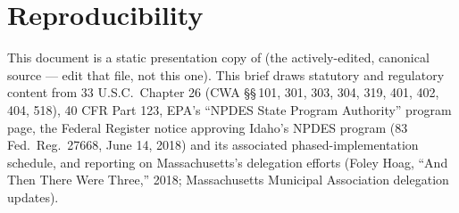 \documentclass[11pt]{article}
\begin{document}
\section*{Reproducibility}
This document is a static presentation copy of 
(the actively-edited, canonical source --- edit that file, not this one). This brief
draws statutory and regulatory content from 33 U.S.C.\ Chapter 26 (CWA \S\S\,101, 301,
303, 304, 319, 401, 402, 404, 518), 40 CFR Part 123, EPA's ``NPDES State Program
Authority'' program page, the Federal Register notice approving Idaho's NPDES program
(83 Fed.\ Reg.\ 27668, June 14, 2018) and its associated phased-implementation
schedule, and reporting on Massachusetts's delegation efforts (Foley Hoag, ``And Then
There Were Three,'' 2018; Massachusetts Municipal Association delegation updates).
\end{document}
